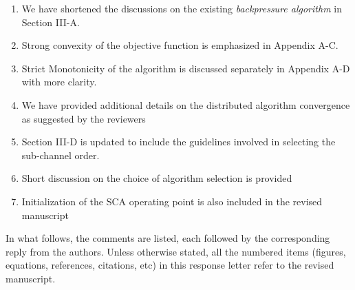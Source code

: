 \begin{enumerate}
\item We have shortened the discussions on the existing \textit{backpressure algorithm} in Section III-A.
\item Strong convexity of the objective function is emphasized in Appendix A-C.
\item Strict Monotonicity of the algorithm is discussed separately in Appendix A-D with more clarity.
\item We have provided additional details on the distributed algorithm convergence as suggested by the reviewers
\item Section III-D is updated to include the guidelines involved in selecting the sub-channel order.
\item Short discussion on the choice of algorithm selection is provided 
\item Initialization of the \ac{SCA} operating point is also included in the revised manuscript
\end{enumerate}

In what follows, the comments are listed, each followed by the corresponding reply from the authors. Unless otherwise stated, all the numbered items (figures, equations, references, citations, etc) in this response letter refer to the revised manuscript.